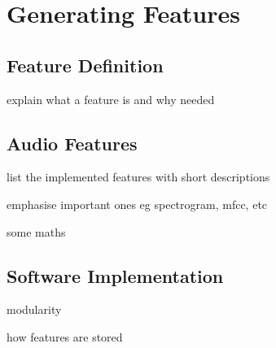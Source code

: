 \section{Generating Features}
\label{sec:pl-feats}
    \subsection{Feature Definition}
    \label{subsec:pl-feats-def}
        \begin{sitemize}
            \item{explain what a feature is and why needed}
        \end{sitemize}
        
    \subsection{Audio Features}
    \label{subsec:pl-feats-audio}
        \begin{sitemize}
            \item{list the implemented features with short descriptions}
            \item{emphasise important ones eg spectrogram, mfcc, etc}
            \item{some maths}
        \end{sitemize}
        
    \subsection{Software Implementation}
    \label{subsec:pl-feats-software}
        \begin{sitemize}
            \item{modularity}
            \item{how features are stored}
        \end{sitemize}
        
  
